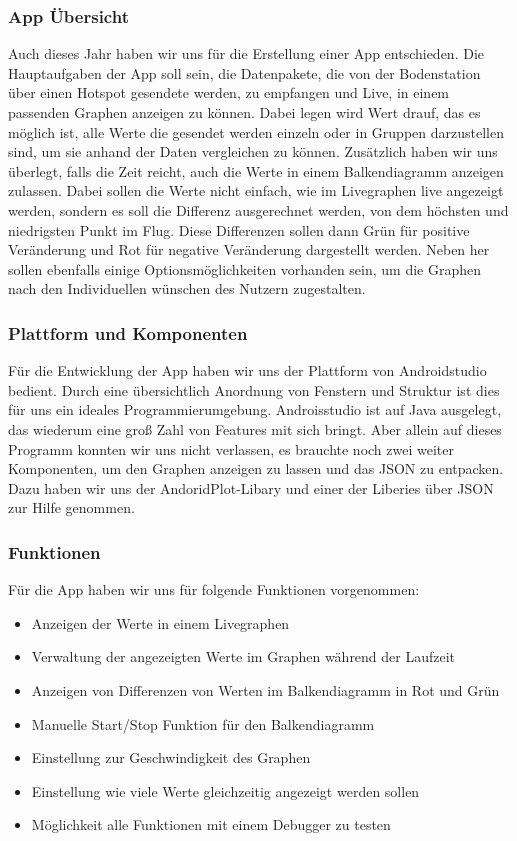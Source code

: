 \subsubsection{App Übersicht}
Auch dieses Jahr haben wir uns für die Erstellung einer App entschieden. Die Hauptaufgaben der App soll sein, die Datenpakete, die von der Bodenstation über einen Hotspot gesendete werden, zu empfangen und Live, in einem passenden Graphen anzeigen zu können. Dabei legen wird Wert drauf, das es möglich ist, alle Werte die gesendet werden einzeln oder in Gruppen darzustellen sind, um sie anhand der Daten vergleichen zu können. Zusätzlich haben wir uns überlegt, falls die Zeit reicht, auch die Werte in einem Balkendiagramm anzeigen zulassen. Dabei sollen die Werte nicht einfach, wie im Livegraphen live angezeigt werden, sondern es soll die Differenz ausgerechnet werden, von dem höchsten und niedrigsten Punkt im Flug. Diese Differenzen sollen dann Grün für positive Veränderung und Rot für negative Veränderung dargestellt werden. Neben her sollen ebenfalls einige Optionsmöglichkeiten vorhanden sein, um die Graphen nach den Individuellen wünschen des Nutzern zugestalten.

\subsubsection{Plattform und Komponenten}
Für die Entwicklung der App haben wir uns der Plattform von Androidstudio bedient. Durch eine übersichtlich Anordnung von Fenstern und Struktur ist dies für uns ein ideales Programmierumgebung. Androisstudio ist auf Java ausgelegt, das wiederum eine groß Zahl von Features mit sich bringt. Aber allein auf dieses Programm konnten wir uns nicht verlassen, es brauchte noch zwei weiter Komponenten, um den Graphen anzeigen zu lassen und das JSON zu entpacken. Dazu haben wir uns der AndoridPlot-Libary und einer der Liberies über JSON zur Hilfe genommen.

\subsubsection{Funktionen}
Für die App haben wir uns für folgende Funktionen vorgenommen:
\begin{itemize}
	\item Anzeigen der Werte in einem Livegraphen
	\item Verwaltung der angezeigten Werte im Graphen während der Laufzeit
	\item Anzeigen von Differenzen von Werten im Balkendiagramm in Rot und Grün
	\item Manuelle Start/Stop Funktion für den Balkendiagramm
	\item Einstellung zur Geschwindigkeit des Graphen
	\item Einstellung wie viele Werte gleichzeitig angezeigt werden sollen
	\item Möglichkeit alle Funktionen mit einem Debugger zu testen
\end{itemize}


